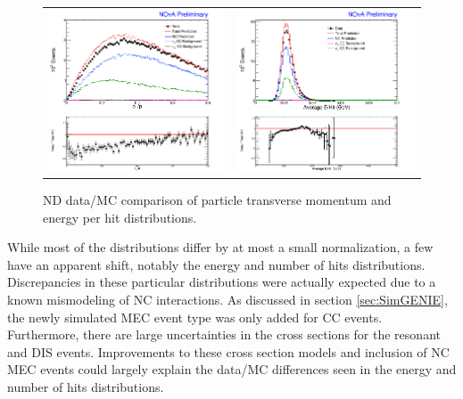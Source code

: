 \begin{figure}[p]
  \centering
  \begin{tabular}{c c}
    \includegraphics[width=.47\textwidth]{figures/NDDataMC/PTPNusNDRat.png} &
    \includegraphics[width=.47\textwidth]{figures/NDDataMC/EpHNusNDRat.png} \\
  \end{tabular}
  \caption[ND Data/MC Comparison: Cosmic Rejection Variable Distribution]{ND data/MC comparison of particle transverse momentum and energy per hit distributions.}
  \label{fig:NDDataMCCosRej}
\end{figure}

\n While most of the distributions differ by at most a small normalization, a few have an apparent shift, notably the energy and number of hits distributions. Discrepancies in these particular distributions were actually expected due to a known mismodeling of NC interactions. As discussed in section \ref{sec:SimGENIE}, the newly simulated MEC event type was only added for CC events. Furthermore, there are large uncertainties in the cross sections for the resonant and DIS events. Improvements to these cross section models and inclusion of NC MEC events could largely explain the data/MC differences seen in the energy and number of hits distributions.

